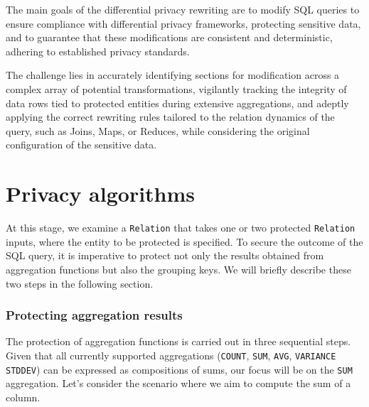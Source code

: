 \documentclass[letterpaper]{article} %
\begin{document}
The main goals of the differential privacy rewriting are to modify SQL queries to ensure compliance with differential privacy frameworks, protecting sensitive data, and to guarantee that these modifications are consistent and deterministic, adhering to established privacy standards.

The challenge lies in accurately identifying sections for modification across a complex array of potential transformations, vigilantly tracking the integrity of data rows tied to protected entities during extensive aggregations, and adeptly applying the correct rewriting rules tailored to the relation dynamics of the query, such as Joins, Maps, or Reduces, while considering the original configuration of the sensitive data.



\section{Privacy algorithms}
\label{sec:privacy_algos}

At this stage, we examine a \texttt{Relation} that takes one or two protected \texttt{Relation} inputs, where the entity to be protected is specified.
To secure the outcome of the SQL query, it is imperative to protect not only the results obtained from aggregation functions but also the grouping keys.
We will briefly describe these two steps in the following section.

\subsubsection{Protecting aggregation results}

The protection of aggregation functions is carried out in three sequential steps. Given that all currently supported aggregations (\texttt{COUNT}, \texttt{SUM}, \texttt{AVG}, \texttt{VARIANCE} \texttt{STDDEV}) can be expressed as compositions of sums, our focus will be on the \texttt{SUM} aggregation. Let's consider the scenario where we aim to compute the sum of a column.
\end{document}
